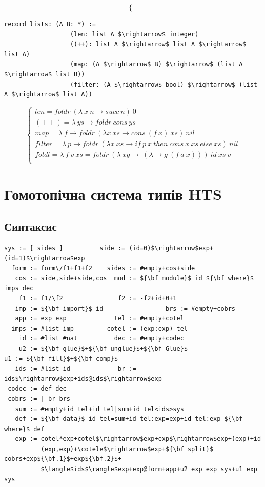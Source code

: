 \begin{definition}
\begin{definition}
\begin{definition}
\begin{definition}
$$\begin{cases}
\end{cases}
$$
\begin{lstlisting}[mathescape=true]
           record lists: (A B: *) :=
                  (len: list A $\rightarrow$ integer)
                  ((++): list A $\rightarrow$ list A $\rightarrow$ list A)
                  (map: (A $\rightarrow$ B) $\rightarrow$ (list A $\rightarrow$ list B))
                  (filter: (A $\rightarrow$ bool) $\rightarrow$ (list A $\rightarrow$ list A))
\end{lstlisting}
$$
\begin{cases}
len = foldr\ (\lambda\ x\ n \rightarrow succ\ n)\ 0\\
(++) = \lambda\ ys \rightarrow foldr\ cons\ ys\\
map = \lambda\ f \rightarrow foldr\ (\lambda x\ xs \rightarrow cons\ (f\ x)\ xs)\ nil\\
filter = \lambda\ p \rightarrow foldr\ (\lambda x\ xs \rightarrow if\ p\ x\ then\ cons\ x\ xs\ else\ xs)\ nil\\
foldl = \lambda\ f\ v\ xs = foldr\ (\lambda\ xg\rightarrow\ (\lambda \rightarrow g\ (f\ a\ x)))\ id\ xs\ v\\
\end{cases}
$$

\newpage
\section{Гомотопічна система типів HTS}

\subsection{Синтаксис}

\begin{lstlisting}[mathescape=true]
   sys := [ sides ]          side := (id=0)$\rightarrow$exp+(id=1)$\rightarrow$exp
  form := form\/f1+f1+f2    sides := #empty+cos+side
   cos := side,side+side,cos  mod := ${\bf module}$ id ${\bf where}$ imps dec
    f1 := f1/\f2               f2 := -f2+id+0+1
   imp := ${\bf import}$ id                 brs := #empty+cobrs
   app := exp exp             tel := #empty+cotel
  imps := #list imp         cotel := (exp:exp) tel
    id := #list #nat          dec := #empty+codec
    u2 := ${\bf glue}$+${\bf unglue}$+${\bf Glue}$                   u1 := ${\bf fill}$+${\bf comp}$
   ids := #list id             br := ids$\rightarrow$exp+ids@ids$\rightarrow$exp
 codec := def dec
 cobrs := | br brs
   sum := #empty+id tel+id tel|sum+id tel<ids>sys   
   def := ${\bf data}$ id tel=sum+id tel:exp=exp+id tel:exp ${\bf where}$ def
   exp := cotel*exp+cotel$\rightarrow$exp+exp$\rightarrow$exp+(exp)+id
          (exp,exp)+\cotele$\rightarrow$exp+${\bf split}$ cobrs+exp${\bf.1}$+exp${\bf.2}$+
          $\langle$ids$\rangle$exp+exp@form+app+u2 exp exp sys+u1 exp sys
\end{lstlisting}


\end{definition}
\end{definition}
\end{definition}
\end{definition}
